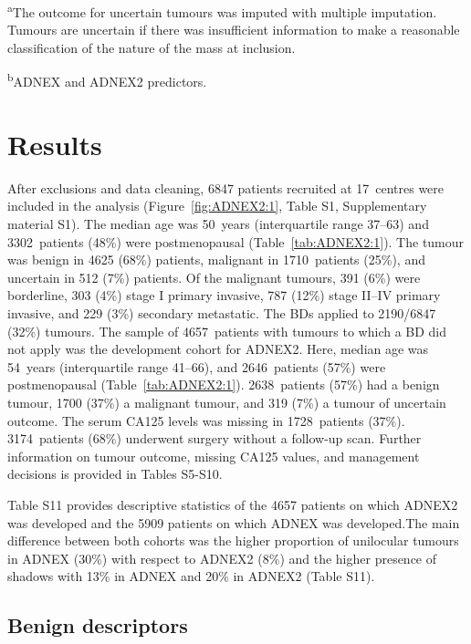 \begin{table}
{\begin{minipage}[t]{\textwidth}
\textsuperscript{a}The outcome for uncertain tumours was imputed with multiple imputation. Tumours are uncertain if there was insufficient information to make a reasonable classification of the nature of the mass at inclusion.

\textsuperscript{b}ADNEX and ADNEX2 predictors.
\end{minipage}%
}
\end{table}

\section{Results}

After exclusions and data cleaning, 6847 patients recruited at 17~centres were included in the analysis (Figure~\ref{fig:ADNEX2:1}, Table S1, Supplementary material S1). The median age was 50~years (interquartile range 37--63) and 3302~patients (48\%) were postmenopausal (Table~\ref{tab:ADNEX2:1}). The tumour was benign in 4625 (68\%) patients, malignant in 1710~patients (25\%), and uncertain in 512 (7\%) patients. Of the malignant tumours, 391 (6\%) were borderline, 303 (4\%) stage I primary invasive, 787 (12\%) stage II--IV primary invasive, and 229 (3\%) secondary metastatic. The \glspl{BD} applied to 2190/6847 (32\%) tumours. The sample of 4657~patients with tumours to which a \gls{BD} did not apply was the development cohort for ADNEX2. Here, median age was 54~years (interquartile range 41--66), and 2646~patients (57\%) were postmenopausal (Table~\ref{tab:ADNEX2:1}). 2638~patients (57\%) had a benign tumour, 1700 (37\%) a malignant tumour, and 319 (7\%) a tumour of uncertain outcome. The serum \gls{CA125} levels was missing in 1728~patients (37\%). 3174~patients (68\%) underwent surgery without a follow-up scan. Further information on tumour outcome, missing CA125 values, and management decisions is provided in Tables S5-S10. 

Table S11 provides descriptive statistics of the 4657 patients on which ADNEX2 was developed and the 5909 patients on which ADNEX was developed.The main difference between both cohorts was the higher proportion of unilocular tumours in ADNEX (30\%) with respect to ADNEX2 (8\%) and the higher presence of shadows with 13\% in ADNEX and 20\% in ADNEX2 (Table S11). 

\subsection{Benign descriptors}

